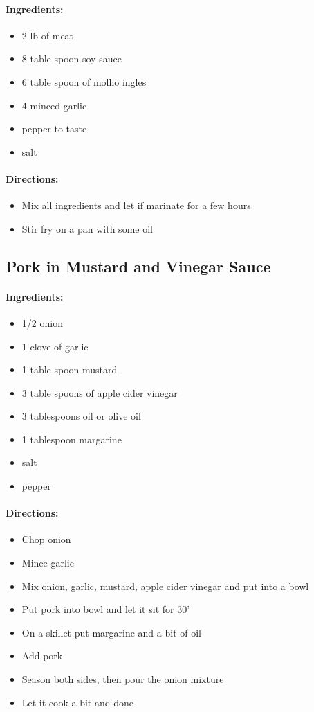 \documentclass{article}
\begin{document}
\paragraph{Ingredients:}
\begin{itemize}
    \item 2 lb of meat
    \item 8 table spoon soy sauce
    \item 6 table spoon of molho ingles
    \item 4 minced garlic
    \item pepper to taste
    \item salt
\end{itemize}

\paragraph{Directions:}
\begin{itemize}
    \item Mix all ingredients and let if marinate for a few hours
    \item Stir fry on a pan with some oil
\end{itemize}

\subsection{Pork in Mustard and Vinegar Sauce}

\paragraph{Ingredients:}
\begin{itemize}
    \item 1/2 onion
    \item 1 clove of garlic
    \item 1 table spoon mustard
    \item 3 table spoons of apple cider vinegar
    \item 3 tablespoons oil or olive oil
    \item 1 tablespoon margarine
    \item salt
    \item pepper
\end{itemize}

\paragraph{Directions:}
\begin{itemize}
    \item Chop onion
    \item Mince garlic
    \item Mix onion, garlic, mustard, apple cider vinegar and put into a bowl
    \item Put pork into bowl and let it sit for 30'
    \item On a skillet put margarine and a bit of oil
    \item Add pork
    \item Season both sides, then pour the onion mixture
    \item Let it cook a bit and done
\end{itemize}
\end{document}
